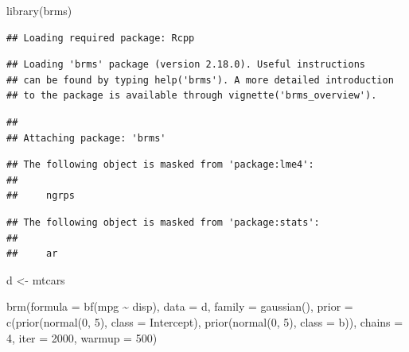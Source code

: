 \documentclass[
]{book}
\newenvironment{Shaded}{\begin{snugshade}}{\end{snugshade}}
\newcommand{\AttributeTok}[1]{\textcolor[rgb]{0.77,0.63,0.00}{#1}}
\newcommand{\DecValTok}[1]{\textcolor[rgb]{0.00,0.00,0.81}{#1}}
\newcommand{\FunctionTok}[1]{\textcolor[rgb]{0.00,0.00,0.00}{#1}}
\newcommand{\NormalTok}[1]{#1}
\newcommand{\OtherTok}[1]{\textcolor[rgb]{0.56,0.35,0.01}{#1}}
\newcommand{\SpecialCharTok}[1]{\textcolor[rgb]{0.00,0.00,0.00}{#1}}
\begin{document}
\begin{Shaded}
\begin{Highlighting}[]
\FunctionTok{library}\NormalTok{(brms)}
\end{Highlighting}
\end{Shaded}

\begin{verbatim}
## Loading required package: Rcpp
\end{verbatim}

\begin{verbatim}
## Loading 'brms' package (version 2.18.0). Useful instructions
## can be found by typing help('brms'). A more detailed introduction
## to the package is available through vignette('brms_overview').
\end{verbatim}

\begin{verbatim}
## 
## Attaching package: 'brms'
\end{verbatim}

\begin{verbatim}
## The following object is masked from 'package:lme4':
## 
##     ngrps
\end{verbatim}

\begin{verbatim}
## The following object is masked from 'package:stats':
## 
##     ar
\end{verbatim}

\begin{Shaded}
\begin{Highlighting}[]
\NormalTok{d }\OtherTok{\textless{}{-}}\NormalTok{ mtcars}

\FunctionTok{brm}\NormalTok{(}\AttributeTok{formula =} \FunctionTok{bf}\NormalTok{(mpg }\SpecialCharTok{\textasciitilde{}}\NormalTok{ disp),}
    \AttributeTok{data =}\NormalTok{ d,}
    \AttributeTok{family =} \FunctionTok{gaussian}\NormalTok{(),}
    \AttributeTok{prior =} \FunctionTok{c}\NormalTok{(}\FunctionTok{prior}\NormalTok{(}\FunctionTok{normal}\NormalTok{(}\DecValTok{0}\NormalTok{, }\DecValTok{5}\NormalTok{), }\AttributeTok{class =}\NormalTok{ Intercept),}
              \FunctionTok{prior}\NormalTok{(}\FunctionTok{normal}\NormalTok{(}\DecValTok{0}\NormalTok{, }\DecValTok{5}\NormalTok{), }\AttributeTok{class =}\NormalTok{ b)),}
    \AttributeTok{chains =} \DecValTok{4}\NormalTok{, }\AttributeTok{iter =} \DecValTok{2000}\NormalTok{, }\AttributeTok{warmup =} \DecValTok{500}\NormalTok{)}
\end{Highlighting}
\end{Shaded}
\end{document}
